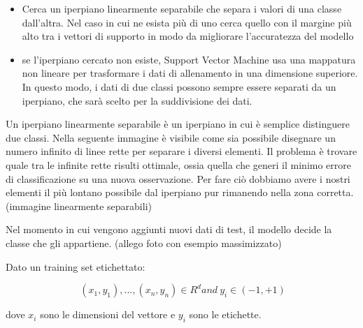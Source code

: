 \documentclass[12pt,italian]{report}
\begin{document}
\begin{itemize}
	\item Cerca un iperpiano linearmente separabile che separa i valori di una classe dall'altra. Nel caso in cui ne esista più di uno cerca quello con il margine più alto tra i vettori di supporto in modo da migliorare l'accuratezza del modello
	\item se l'iperpiano cercato non esiste, Support Vector Machine usa una mappatura non lineare per trasformare i dati di allenamento in una dimensione superiore. In questo modo, i dati di due classi possono sempre essere separati da un iperpiano, che sarà scelto per la suddivisione dei dati.  
\end{itemize}

Un iperpiano linearmente separabile è un iperpiano in cui è semplice distinguere due classi. Nella seguente immagine è visibile come sia possibile disegnare un numero infinito di linee rette per separare i diversi elementi. Il problema è trovare quale tra le infinite rette risulti ottimale, ossia quella che generi il minimo errore di classificazione su una nuova osservazione.
Per fare ciò dobbiamo avere i nostri elementi il più lontano possibile dal iperpiano pur rimanendo nella zona corretta. (immagine linearmente separabili)

Nel momento in cui vengono aggiunti nuovi dati di test, il modello decide la classe che gli appartiene. (allego foto con esempio massimizzato)

Dato un training set etichettato:

\begin{center}
	\[
	\ (x_1, y_1), ..., (x_n, y_n) \in R^{d} and 
	\ y_i \in (-1, +1)
	\]
\end{center}
dove $x_i$ sono le dimensioni del vettore e $y_i$ sono le etichette.
\end{document}
